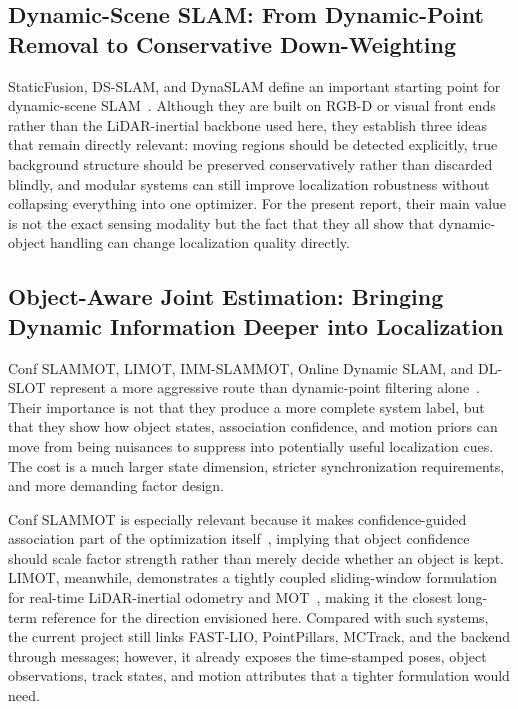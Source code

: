 \documentclass[a4paper,12pt]{article}
\begin{document}
\subsection{Dynamic-Scene SLAM: From Dynamic-Point Removal to Conservative Down-Weighting}
StaticFusion, DS-SLAM, and DynaSLAM define an important starting point for dynamic-scene SLAM~\cite{staticfusion,ds-slam,dynaslam}. Although they are built on RGB-D or visual front ends rather than the LiDAR-inertial backbone used here, they establish three ideas that remain directly relevant: moving regions should be detected explicitly, true background structure should be preserved conservatively rather than discarded blindly, and modular systems can still improve localization robustness without collapsing everything into one optimizer. For the present report, their main value is not the exact sensing modality but the fact that they all show that dynamic-object handling can change localization quality directly.

\subsection{Object-Aware Joint Estimation: Bringing Dynamic Information Deeper into Localization}
Conf SLAMMOT, LIMOT, IMM-SLAMMOT, Online Dynamic SLAM, and DL-SLOT represent a more aggressive route than dynamic-point filtering alone~\cite{confslammot,limot,imm-slammot,online-dynamic-slam,dl-slot}. Their importance is not that they produce a more complete system label, but that they show how object states, association confidence, and motion priors can move from being nuisances to suppress into potentially useful localization cues. The cost is a much larger state dimension, stricter synchronization requirements, and more demanding factor design.

Conf SLAMMOT is especially relevant because it makes confidence-guided association part of the optimization itself~\cite{confslammot}, implying that object confidence should scale factor strength rather than merely decide whether an object is kept. LIMOT, meanwhile, demonstrates a tightly coupled sliding-window formulation for real-time LiDAR-inertial odometry and MOT~\cite{limot}, making it the closest long-term reference for the direction envisioned here. Compared with such systems, the current project still links FAST-LIO, PointPillars, MCTrack, and the backend through messages; however, it already exposes the time-stamped poses, object observations, track states, and motion attributes that a tighter formulation would need.
\end{document}
